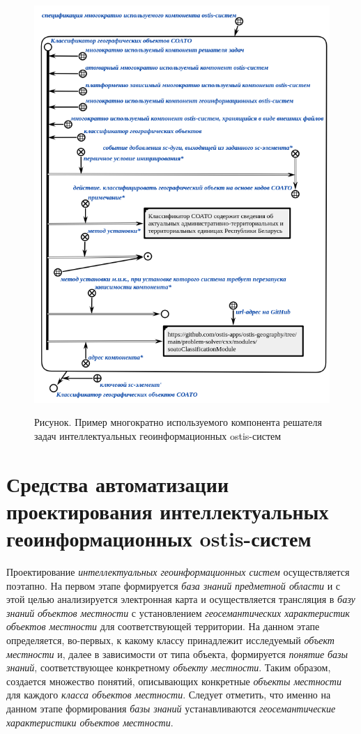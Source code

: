 \begin{figure}[H]
	\caption{Рисунок. Пример многократно используемого компонента решателя задач интеллектуальных геоинформационных ostis-систем}
	\includegraphics[scale=0.8]{author/part7/figures/gis_ps_component.png}
	\label{fig:gis_ps_component}
\end{figure}

\section{Средства автоматизации проектирования интеллектуальных геоинформационных ostis-систем}
\label{chapter_gis_sec_automatization}

Проектирование \textit{интеллектуальных геоинформационных систем} осуществляется поэтапно. На первом этапе формируется \textit{база знаний} \textit{предметной области} и с этой целью анализируется электронная карта и осуществляется трансляция в \textit{базу знаний} \textit{объектов местности} с установлением \textit{геосемантических характеристик объектов местности} для соответствующей территории. На данном этапе определяется, во-первых, к какому классу принадлежит исследуемый \textit{объект местности} и, далее в зависимости от типа объекта, формируется \textit{понятие} \textit{базы знаний}, соответствующее конкретному \textit{объекту местности}. Таким образом, создается множество понятий, описывающих конкретные \textit{объекты местности} для каждого \textit{класса объектов местности\scnsupergroupsign}. Следует отметить, что именно на данном этапе формирования \textit{базы знаний} устанавливаются \textit{геосемантические характеристики объектов местности}.

